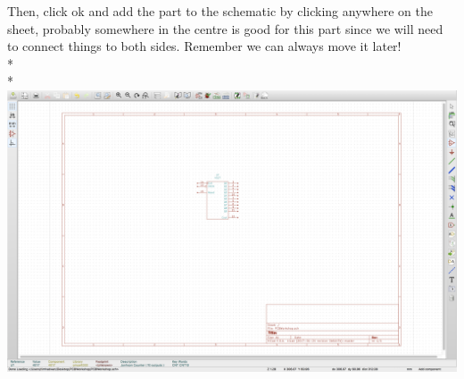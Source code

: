 Then, click ok and add the part to the schematic by clicking anywhere on the sheet, probably somewhere in the centre is good for this part since we will need to connect things to both sides. Remember we can always move it later!
\\*\\*
\includegraphics[width=\textwidth]{sch2}
\newpage